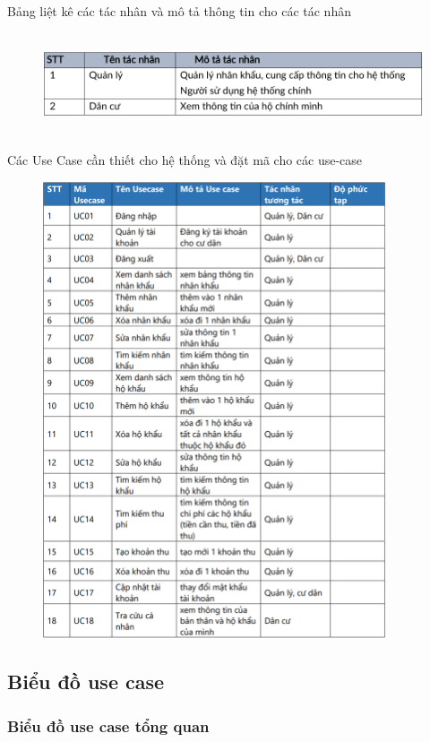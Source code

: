 \documentclass{article}
\begin{document}
Bảng liệt kê các tác nhân và mô tả thông tin cho các tác nhân
\begin{figure}[H]
    \centering
    \includegraphics[width=15.53cm, height = 3cm]{Ảnh chương 2/Bảng tác nhân.png}
\end{figure}
Các Use Case cần thiết cho hệ thống và đặt mã cho các use-case
\begin{figure}[H]
    \centering
    \includegraphics[width=0.9\textwidth]{Ảnh chương 2/Bảng usecase.png}
\end{figure}
\subsection{Biểu đồ use case} 
\subsubsection{Biểu đồ use case tổng quan}
\end{document}
